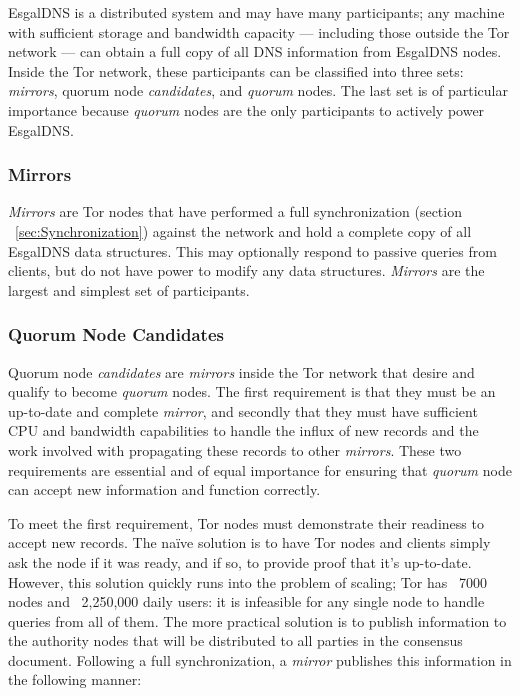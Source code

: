 EsgalDNS is a distributed system and may have many participants; any machine with sufficient storage and bandwidth capacity --- including those outside the Tor network --- can obtain a full copy of all DNS information from EsgalDNS nodes. Inside the Tor network, these participants can be classified into three sets: \emph{mirrors}, quorum node \emph{candidates}, and \emph{quorum} nodes. The last set is of particular importance because \emph{quorum} nodes are the only participants to actively power EsgalDNS.

\subsubsection{Mirrors}

\emph{Mirrors} are Tor nodes that have performed a full synchronization (section ~\ref{sec:Synchronization}) against the network and hold a complete copy of all EsgalDNS data structures. This may optionally respond to passive queries from clients, but do not have power to modify any data structures. \emph{Mirrors} are the largest and simplest set of participants.

\subsubsection{Quorum Node Candidates}

Quorum node \emph{candidates} are \emph{mirrors} inside the Tor network that desire and qualify to become \emph{quorum} nodes. The first requirement is that they must be an up-to-date and complete \emph{mirror}, and secondly that they must have sufficient CPU and bandwidth capabilities to handle the influx of new records and the work involved with propagating these records to other \emph{mirrors}. These two requirements are essential and of equal importance for ensuring that \emph{quorum} node can accept new information and function correctly.

To meet the first requirement, Tor nodes must demonstrate their readiness to accept new records. The na\"{i}ve solution is to have Tor nodes and clients simply ask the node if it was ready, and if so, to provide proof that it's up-to-date. However, this solution quickly runs into the problem of scaling; Tor has ~7000 nodes and ~2,250,000 daily users\cite{TorMetrics}: it is infeasible for any single node to handle queries from all of them. The more practical solution is to publish information to the authority nodes that will be distributed to all parties in the consensus document. Following a full synchronization, a \emph{mirror} publishes this information in the following manner:

